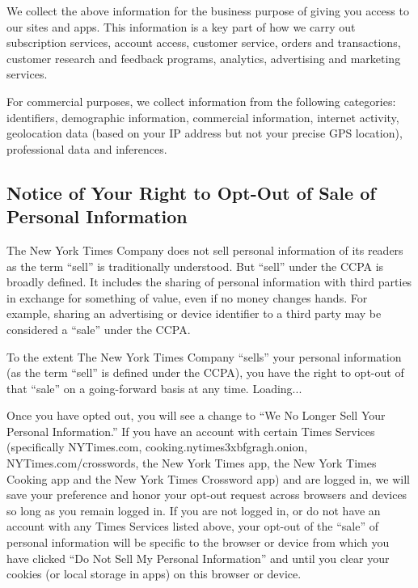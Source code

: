 We collect the above information for the business purpose of giving you
access to our sites and apps. This information is a key part of how we
carry out subscription services, account access, customer service,
orders and transactions, customer research and feedback programs,
analytics, advertising and marketing services.

For commercial purposes, we collect information from the following
categories: identifiers, demographic information, commercial
information, internet activity, geolocation data (based on your IP
address but not your precise GPS location), professional data and
inferences.

\hypertarget{notice-of-your-right-to-opt-out-of-sale-of-personal-information}{%
\subsection{Notice of Your Right to Opt-Out of Sale of Personal
Information}\label{notice-of-your-right-to-opt-out-of-sale-of-personal-information}}

The New York Times Company does not sell personal information of its
readers as the term ``sell'' is traditionally understood. But ``sell''
under the CCPA is broadly defined. It includes the sharing of personal
information with third parties in exchange for something of value, even
if no money changes hands. For example, sharing an advertising or device
identifier to a third party may be considered a ``sale'' under the CCPA.

To the extent The New York Times Company ``sells'' your personal
information (as the term ``sell'' is defined under the CCPA), you have
the right to opt-out of that ``sale'' on a going-forward basis at any
time. Loading...

Once you have opted out, you will see a change to ``We No Longer Sell
Your Personal Information.'' If you have an account with certain Times
Services (specifically NYTimes.com, cooking.nytimes3xbfgragh.onion,
NYTimes.com/crosswords, the New York Times app, the New York Times
Cooking app and the New York Times Crossword app) and are logged in, we
will save your preference and honor your opt-out request across browsers
and devices so long as you remain logged in. If you are not logged in,
or do not have an account with any Times Services listed above, your
opt-out of the ``sale'' of personal information will be specific to the
browser or device from which you have clicked ``Do Not Sell My Personal
Information'' and until you clear your cookies (or local storage in
apps) on this browser or device.


